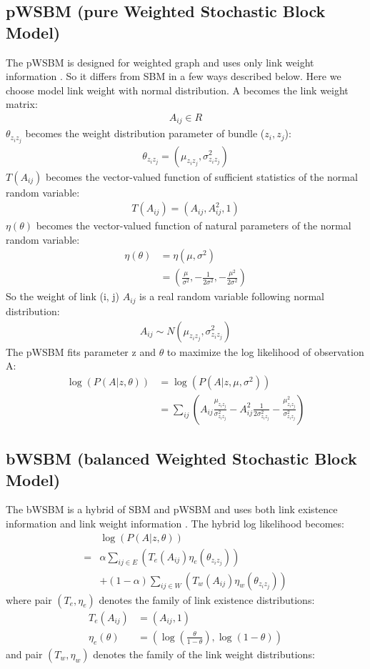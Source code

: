 \documentclass[conference]{IEEEtran}
\begin{document}
\subsection{pWSBM (pure Weighted Stochastic Block Model)}
The pWSBM is designed for weighted graph and uses only link weight information \cite{aicher2014learning}.
So it differs from SBM in a few ways described below.
Here we choose model link weight with normal distribution.
A becomes the link weight matrix:
\begin{align*}
	A_{ij} \in R
\end{align*}
$ \theta_{z_i z_j} $ becomes the weight distribution parameter of bundle ($z_i, z_j$):
\begin{align*}
	\theta_{z_i z_j} = (\mu_{z_i z_j}, \sigma_{z_i z_j}^2)
\end{align*}
$ T(A_{ij}) $ becomes the vector-valued function of sufficient statistics of the normal random variable:
\begin{align*}
	T(A_{ij}) = (A_{ij}, A_{ij}^2, 1)
\end{align*}
$ \eta(\theta) $ becomes the vector-valued function of natural parameters of the normal random variable:
\begin{align*}
	\eta(\theta)
	&= \eta(\mu, \sigma^2)\\
	&= (\frac{\mu}{\sigma^2}, -\frac{1}{2\sigma^2}, -\frac{\mu^2}{2\sigma^2})
\end{align*}
So the weight of link (i, j)  $ A_{ij} $ is a real random variable following normal distribution:
\begin{align*}
	A_{ij} \sim N(\mu_{z_i z_j}, \sigma_{z_i z_j}^2)
\end{align*}
The pWSBM fits parameter z and $ \theta $
to maximize the log likelihood of observation A:
\begin{align*}
\log(P(A|z, \theta))
&= \log(P(A|z, \mu, \sigma^2))\\
&= \sum_{ij} (
A_{ij} \frac{\mu_{z_i z_j}}{\sigma_{z_i z_j}^2}
- A_{ij}^2 \frac{1}{2\sigma_{z_i z_j}^2}
- \frac{\mu_{z_i z_j}^2}{\sigma_{z_i z_j}^2}
)
\end{align*}

\subsection{bWSBM (balanced Weighted Stochastic Block Model)}
The bWSBM is a hybrid of SBM and pWSBM
and uses both link existence information and link weight information \cite{aicher2014learning}.
The hybrid log likelihood becomes:
\begin{align*}
&\log(P(A|z, \theta))\\
=& \alpha \sum_{ij \in E} (T_e(A_{ij}) \eta_e(\theta_{z_i z_j}))\\
& + (1 - \alpha) \sum_{ij \in W} (T_w(A_{ij}) \eta_w(\theta_{z_i z_j}))
\end{align*}
where pair $ (T_e, \eta_e) $ denotes the family of link existence distributions:
\begin{align*}
T_e(A_{ij}) &= (A_{ij}, 1)\\
\eta_e(\theta) &= ( \log(\frac{\theta}{1-\theta}), \log(1-\theta) )
\end{align*}
and pair $ (T_w, \eta_w) $ denotes the family of the link weight distributions:
\end{document}
